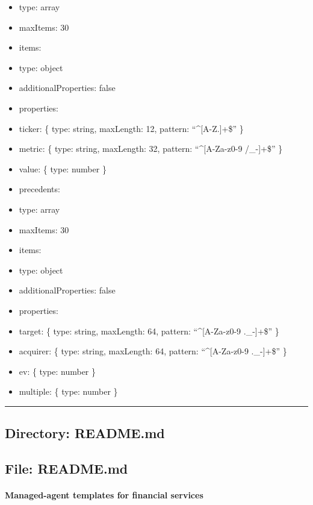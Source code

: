 \documentclass[11pt]{article}
\begin{document}
\begin{itemize}[leftmargin=*,itemsep=2pt,topsep=2pt]
\item {} type: array
\item {} maxItems: 30
\item {} items:
\item {} type: object
\item {} additionalProperties: false
\item {} properties:
\item {} ticker: \{ type: string, maxLength: 12, pattern: ``\textasciicircum{}[A-Z.]+\$'' \}
\item {} metric: \{ type: string, maxLength: 32, pattern: ``\textasciicircum{}[A-Za-z0-9 /\_\allowbreak{}-]+\$'' \}
\item {} value: \{ type: number \}
\item {} precedents:
\item {} type: array
\item {} maxItems: 30
\item {} items:
\item {} type: object
\item {} additionalProperties: false
\item {} properties:
\item {} target: \{ type: string, maxLength: 64, pattern: ``\textasciicircum{}[A-Za-z0-9 .\_\allowbreak{}-]+\$'' \}
\item {} acquirer: \{ type: string, maxLength: 64, pattern: ``\textasciicircum{}[A-Za-z0-9 .\_\allowbreak{}-]+\$'' \}
\item {} ev: \{ type: number \}
\item {} multiple: \{ type: number \}
\end{itemize}

\vspace{0.8em}\hrule\vspace{0.8em}

\subsection{Directory: README.md}

\subsection{File: README.md}\label{file:README-md}

\paragraph{Managed-agent templates for financial services}\mbox{}\par
\end{document}
